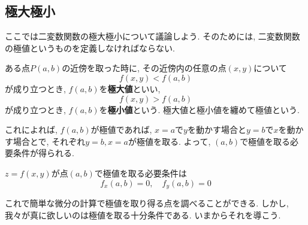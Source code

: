 \documentclass[a4j,dvipdfmx]{jsarticle}
\numberwithin{equation}{section}
\begin{document}
        \subsection{極大極小}
            ここでは二変数関数の極大極小について議論しよう. そのためには, 二変数関数の極値というものを定義しなければならない.

            \begin{screen}
                ある点$P(a,b)$の近傍を取った時に, その近傍内の任意の点$(x,y)$について
                \begin{equation}
                    f(x,y)<f(a,b) \label{eq:偏微分:極大の定義}
                \end{equation}
                が成り立つとき, $f(a,b)$を\textbf{極大値}といい,
                \begin{equation}
                    f(x,y)>f(a,b) \label{eq:偏微分:極小の定義}
                \end{equation}                 
                が成り立つとき, $f(a,b)$を\textbf{極小値}という. 極大値と極小値を纏めて極値という.
            \end{screen}
            これによれば, $f(a,b)$が極値であれば, $x=a$で$y$を動かす場合と$y=b$で$x$を動かす場合とで, それぞれ$y=b,x=a$が極値を取る.
            よって, $(a,b)$で極値を取る必要条件が得られる.
            \begin{screen}
                $z=f(x,y)$が点$(a,b)$で極値を取る必要条件は
                \begin{equation}
                    f_{x}(a,b)=0,\quad f_{y}(a,b)=0 \label{eq:偏微分:極値を取る必要条件}
                \end{equation}
            \end{screen}
            これで簡単な微分の計算で極値を取り得る点を調べることができる. しかし, 我々が真に欲しいのは極値を取る十分条件である. いまからそれを導こう.
\end{document}
